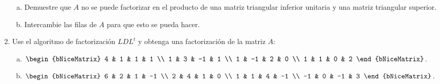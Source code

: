 \documentclass[
	spanish,
	8pt,
	utf8,
	xcolor=table,
	handout,
	aspectratio=169,
	professionalfonts,
	notheorems,
	mathserif,
]{beamer}
\begin{document}
\begin{frame}
\begin{enumerate}
		      \begin{enumerate}[a)]

			      \item

			            Demuestre que $A$ no se puede factorizar en el
			            producto de una matriz triangular inferior
			            unitaria y una matriz triangular superior.

			      \item

			            Intercambie las filas de $A$ para que esto se pueda
			            hacer.
		      \end{enumerate}

		\item

		      Use el algoritmo de factorización $LDL^{t}$ y obtenga una
		      factorización de la matriz $A$:

		      \begin{multicols}{2}
			      \begin{enumerate}[a)]
				      \item

				            \begin{math}
					            \begin{bNiceMatrix}
						            4 & 1  & 1  & 1 \\
						            1 & 3  & -1 & 1 \\
						            1 & -1 & 2  & 0 \\
						            1 & 1  & 0  & 2
					            \end{bNiceMatrix}
				            \end{math}.

				      \item

				            \begin{math}
					            \begin{bNiceMatrix}
						            6  & 2 & 1  & -1 \\
						            2  & 4 & 1  & 0  \\
						            1  & 1 & 4  & -1 \\
						            -1 & 0 & -1 & 3
					            \end{bNiceMatrix}
				            \end{math}.
			      \end{enumerate}
		      \end{multicols}


\end{enumerate}
\end{frame}
\end{document}

